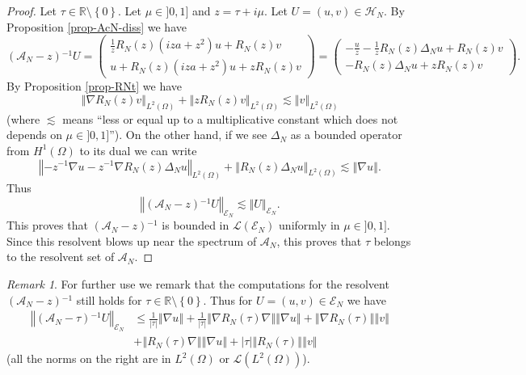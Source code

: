 \documentclass[10pt, a4paper,reqno]{amsart}
\theoremstyle{plain}
\theoremstyle{definition}
\theoremstyle{remark}
\newtheorem{remark}[theorem]{Remark}
\begin{document}
\begin{proof}
Let ${\tau} \in {\mathbb{R}} \setminus {\left\{ 0 \right\}}$. Let ${\mu} \in ]0,1]$ and $z = {\tau} + i {\mu}$. Let $U = (u,v) \in {\mathcal H_N}$. By Proposition \ref{prop-AcN-diss} we have 
\[
({{{\mathcal A}}_N}-z){^{-1}} U = 
\begin{pmatrix}
\frac 1 z {R_N(z)} (iza+z^2) u + {R_N(z)} v \\
u + {R_N(z)} (iza+z^2) u + z {R_N(z)} v
\end{pmatrix}
= 
\begin{pmatrix}
- \frac u z - \frac 1 z {R_N(z)} {{\Delta}_N} u + {R_N(z)} v \\
-{R_N(z)} {{\Delta}_N} u + z {R_N(z)} v
\end{pmatrix}.
\]
By Proposition \ref{prop-RNt} we have 
\[
{\left\Vert { \nabla {R_N(z)} v}\right\Vert}_{L^2({\Omega})} + {\left\Vert {z {R_N(z)} v}\right\Vert}_{L^2({\Omega})} \lesssim {\left\Vert {v}\right\Vert}_{L^2({\Omega})}
\]
(where $\lesssim$ means ``less or equal up to a multiplicative constant which does not depends on ${\mu} \in ]0,1]$''). On the other hand, if we see ${{\Delta}_N}$ as a bounded operator from $H^1({\Omega})$ to its dual we can write
\[
{\left\Vert {-z{^{-1}} \nabla u - z {^{-1}} \nabla {R_N(z)} {{\Delta}_N} u}\right\Vert}_{L^2({\Omega})} + {\left\Vert {{R_N(z)} {{\Delta}_N} u}\right\Vert}_{L^2({\Omega})} \lesssim {\left\Vert {\nabla u}\right\Vert}.
\]
Thus 
\[
{\left\Vert {({{{\mathcal A}}_N}-z){^{-1}} U}\right\Vert}_{\mathscr E_N} \lesssim {\left\Vert {U}\right\Vert}_{\mathscr E_N}.
\]
This proves that $({{{\mathcal A}}_N} -z){^{-1}}$ is bounded in ${{\mathcal L}}({\mathscr E_N})$ uniformly in ${\mu} \in ]0,1]$. Since this resolvent blows up near the spectrum of ${{{\mathcal A}}_N}$, this proves that ${\tau}$ belongs to the resolvent set of ${{{\mathcal A}}_N}$.
\end{proof}

\begin{remark} \label{rem-expr-res}
For further use we remark that the computations for the resolvent $({{{\mathcal A}}_N}-z){^{-1}}$ still holds for ${\tau} \in {\mathbb{R}} \setminus {\left\{ 0 \right\}}$. Thus for $U = (u,v) \in {\mathscr E_N}$ we have 
\begin{align*}
{\left\Vert {({{{\mathcal A}}_N} - {\tau}){^{-1}} U}\right\Vert}_{\mathscr E_N}
& {\leqslant} \frac 1 {{\left\vert {\tau}\right\vert}} {\left\Vert {\nabla u}\right\Vert} + \frac 1 {{\left\vert {\tau}\right\vert}} {\left\Vert {\nabla {R_N({\tau})} \nabla}\right\Vert} {\left\Vert {\nabla u}\right\Vert} + {\left\Vert {\nabla {R_N({\tau})}}\right\Vert} {\left\Vert {v}\right\Vert}\\
& + {\left\Vert {{R_N({\tau})} \nabla}\right\Vert} {\left\Vert {\nabla u}\right\Vert} + {\left\vert {\tau}\right\vert} {\left\Vert {R_N({\tau})}\right\Vert} {\left\Vert {v}\right\Vert}
\end{align*}
(all the norms on the right are in $L^2({\Omega})$ or ${{\mathcal L}}(L^2({\Omega}))$).
\end{remark}
\end{document}
